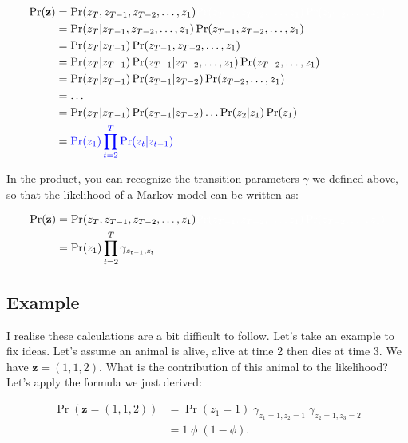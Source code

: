 \documentclass[
  12pt,
]{krantz}
\begin{document}
\begin{align*}
\Pr(\mathbf{z}) &= \Pr(z_T, z_{T-1}, z_{T-2}, \ldots, z_1) \color{white}{\Pr(z_{T-1}, z_{T-2},\ldots, z_1) \Pr(z_{T-2}, \ldots, z_1)}\\
                &= \Pr(z_T | z_{T-1}, z_{T-2},\ldots, z_1) \Pr(z_{T-1}, z_{T-2},\ldots, z_1) \\
                &= \Pr(z_T | z_{T-1}) \Pr(z_{T-1}, z_{T-2},\ldots, z_1) \\
                &= \Pr(z_T | z_{T-1}) \Pr(z_{T-1} | z_{T-2}, \ldots, z_1) \Pr(z_{T-2}, \ldots, z_1)\\
                &= \Pr(z_T | z_{T-1}) \Pr(z_{T-1} | z_{T-2}) \Pr(z_{T-2}, \ldots, z_1)\\
                &= \ldots \\
                &= \Pr(z_T | z_{T-1}) \Pr(z_{T-1} | z_{T-2}) \ldots \Pr(z_{2} | z_{1}) \Pr(z_{1})\\
                &= \color{blue}{\Pr(z_{1}) \prod_{t=2}^T{\Pr(z_{t} | z_{t-1})}}\\
\end{align*}

In the product, you can recognize the transition parameters \(\gamma\) we defined above, so that the likelihood of a Markov model can be written as:

\begin{align*}
\Pr(\mathbf{z}) &= \Pr(z_T, z_{T-1}, z_{T-2}, \ldots, z_1) \color{white}{\Pr(z_{T-1}, z_{T-2},\ldots, z_1) \Pr(z_{T-2}, \ldots, z_1)}\\
                &= \Pr(z_{1}) \prod_{t=2}^T{\gamma_{z_{t-1},z_{t}}}\\
\end{align*}

\subsection{Example}\label{example}

I realise these calculations are a bit difficult to follow. Let's take an example to fix ideas. Let's assume an animal is alive, alive at time 2 then dies at time 3. We have \(\mathbf{z} = (1, 1, 2)\). What is the contribution of this animal to the likelihood? Let's apply the formula we just derived:

\begin{align*}
\Pr(\mathbf{z} = (1, 1, 2)) &= \Pr(z_1 = 1) \; \gamma_{z_{1} = 1, z_{2} = 1} \; \gamma_{z_{2} = 1, z_{3} = 2}\\
                            &= 1 \; \phi \; (1 - \phi).
\end{align*}
\end{document}
